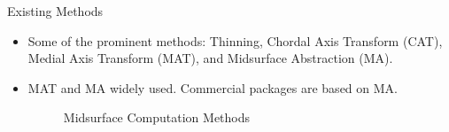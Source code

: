 \begin{frame}{Existing Methods}
\begin{itemize}[noitemsep,label=\textbullet,topsep=2pt,parsep=2pt,partopsep=2pt]
\item Some of the prominent methods: Thinning, Chordal Axis Transform (CAT), Medial Axis Transform (MAT), and Midsurface Abstraction (MA).
\item MAT and MA widely used. Commercial packages are based on MA.
\begin{figure}[h!]
\centering     %
{}
\caption{Midsurface Computation Methods}
\end{figure}
\end{itemize}
\end{frame}

